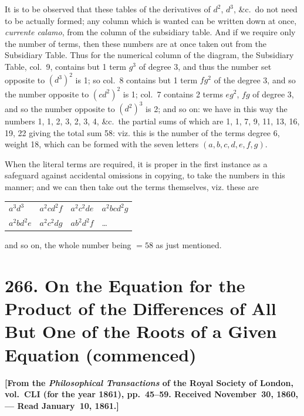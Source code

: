 \documentclass[11pt,a4paper]{book}
\begin{document}
It is to be observed that these tables of the derivatives of $d^2$, $d^3$, \&c.\ do not need to be actually formed; any column which is wanted can be written down at once, \textit{currente calamo}, from the column of the subsidiary table. And if we require only the number of terms, then these numbers are at once taken out from the Subsidiary Table. Thus for the numerical column of the diagram, the Subsidiary Table, col.~9, contains but 1 term $g^3$ of degree 3, and thus the number set opposite to $(d^3)^2$ is 1; so col.~8 contains but 1 term $fg^2$ of the degree 3, and so the number opposite to $(c\!d^2)^2$ is 1; col.~7 contains 2 terms $eg^2$, $fg$ of degree 3, and so the number opposite to $(d^2)^3$ is 2; and so on: we have in this way the numbers 1, 1, 2, 3, 2, 3, 4, \&c.\ the partial sums of which are 1, 1, 7, 9, 11, 13, 16, 19, 22 giving the total sum 58: viz. this is the number of the terms degree 6, weight 18, which can be formed with the seven letters $(a,b,c,d,e,f,g)$.

When the literal terms are required, it is proper in the first instance as a safeguard against accidental omissions in copying, to take the numbers in this manner; and we can then take out the terms themselves, viz. these are
\begin{center}
\begin{tabular}{llll}
$a^3d^3$ & $a^2cd^2f$ & $a^2c^2de$ & $a^2bcd^2g$ \\
$a^2bd^2e$ & $a^2c^2dg$ & $ab^2d^2f$ & \ldots \\
\end{tabular}
\end{center}
and so on, the whole number being $=58$ as just mentioned.

\newpage
\section[266. Equation for the Product of the Differences]{266. On the Equation for the Product of the Differences of All But One of the Roots of a Given Equation (commenced)}

\textbf{[From the \textit{Philosophical Transactions} of the Royal Society of London, vol.~CLI (for the year 1861), pp.~45--59. Received November~30, 1860, --- Read January~10, 1861.]}
\end{document}
